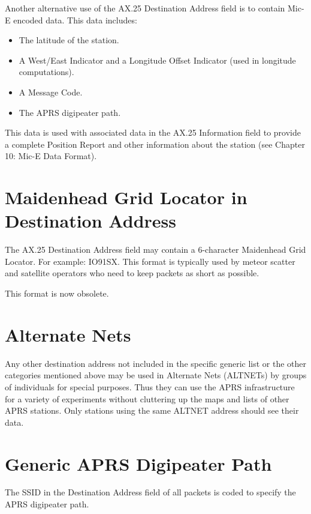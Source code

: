 Another alternative use of the AX.25 Destination Address field is to contain
Mic-E encoded data. This data includes:

\begin{itemize}

\item The latitude of the station.

\item A West/East Indicator and a Longitude Offset Indicator (used in
longitude computations).

\item A Message Code.

\item The APRS digipeater path.

\end{itemize}
This data is used with associated data in the AX.25 Information field to
provide a complete Position Report and other information about the station
(see Chapter 10: Mic-E Data Format).

\section {Maidenhead Grid Locator in Destination Address}

The AX.25 Destination Address field may contain a 6-character Maidenhead
Grid Locator. For example: \textsf{IO91SX}. This format is typically used by meteor
scatter and satellite operators who need to keep packets as short as possible.

This format is now obsolete.

\section{Alternate Nets}

Any other destination address not included in the specific generic list or the
other categories mentioned above may be used in Alternate Nets (ALTNETs)
by groups of individuals for special purposes. Thus they can use the APRS
infrastructure for a variety of experiments without cluttering up the maps and
lists of other APRS stations. Only stations using the same ALTNET address
should see their data.

\section{Generic APRS Digipeater Path}


The SSID in the Destination Address field of all packets is coded to specify
the APRS digipeater path.

